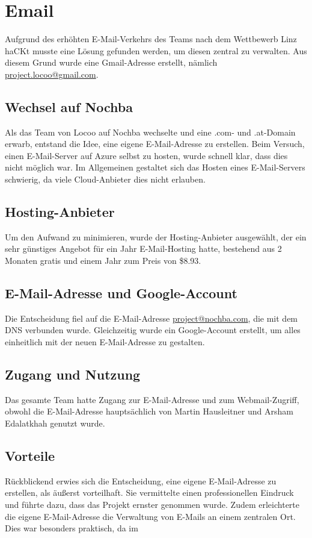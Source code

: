 \section{Email}
Aufgrund des erhöhten E-Mail-Verkehrs des Teams nach dem Wettbewerb Linz haCKt musste eine Lösung gefunden werden, um diesen zentral zu verwalten. Aus diesem Grund wurde eine Gmail-Adresse erstellt, nämlich \href{mailto:project.locoo@gmail.com}{project.locoo@gmail.com}.

\subsection{Wechsel auf Nochba}
Als das Team von Locoo auf Nochba wechselte und eine .com- und .at-Domain erwarb, entstand die Idee, eine eigene E-Mail-Adresse zu erstellen. Beim Versuch, einen E-Mail-Server auf Azure selbst zu hosten, wurde schnell klar, dass dies nicht möglich war. Im Allgemeinen gestaltet sich das Hosten eines E-Mail-Servers schwierig, da viele Cloud-Anbieter dies nicht erlauben.

\subsection{Hosting-Anbieter}
Um den Aufwand zu minimieren, wurde der Hosting-Anbieter \cite{namecheap} ausgewählt, der ein sehr günstiges Angebot für ein Jahr E-Mail-Hosting hatte, bestehend aus 2 Monaten gratis und einem Jahr zum Preis von \$8.93.

\subsection{E-Mail-Adresse und Google-Account}
Die Entscheidung fiel auf die E-Mail-Adresse
\href{mailto:project@nochba.com}{project@nochba.com}, die mit dem DNS verbunden wurde.
Gleichzeitig wurde ein Google-Account erstellt, um alles
einheitlich mit der neuen E-Mail-Adresse zu gestalten.

\subsection{Zugang und Nutzung}
Das gesamte Team hatte Zugang zur E-Mail-Adresse und zum Webmail-Zugriff, obwohl die E-Mail-Adresse hauptsächlich von Martin Hausleitner und Arsham Edalatkhah genutzt wurde.

\subsection{Vorteile}
Rückblickend erwies sich die Entscheidung, eine eigene
E-Mail-Adresse zu erstellen, als äußerst vorteilhaft. Sie
vermittelte einen professionellen Eindruck und führte dazu,
dass das Projekt ernster genommen wurde. Zudem erleichterte
die eigene E-Mail-Adresse die Verwaltung von E-Mails an
einem zentralen Ort. Dies war besonders praktisch, da im



